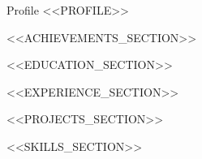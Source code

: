 \documentclass{resume}
\begin{document}
\begin{rSection}{Profile}
<<PROFILE>>
\end{rSection}

<<ACHIEVEMENTS_SECTION>>

<<EDUCATION_SECTION>>

<<EXPERIENCE_SECTION>>

<<PROJECTS_SECTION>>

<<SKILLS_SECTION>>
\end{document}
